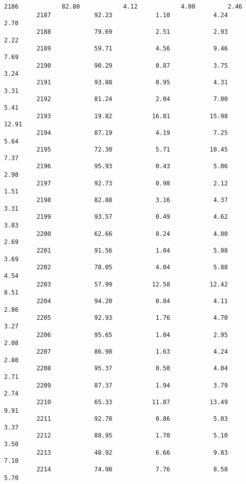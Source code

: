 \documentclass[11pt]{llncs}
\begin{document}
\begin{Verbatim}[commandchars=\\\{\}]
         2186            82.80            4.12            4.00         2.46   
         2187            92.23            1.10            4.24         2.70   
         2188            79.69            2.51            2.93         2.22   
         2189            59.71            4.56            9.46         7.69   
         2190            90.29            0.87            3.75         3.24   
         2191            93.88            0.95            4.31         3.31   
         2192            81.24            2.04            7.00         5.41   
         2193            19.82           16.81           15.98        12.91   
         2194            87.19            4.19            7.25         5.64   
         2195            72.30            5.71           10.45         7.37   
         2196            95.93            0.43            5.06         2.98   
         2197            92.73            0.98            2.12         1.51   
         2198            82.88            3.16            4.37         3.31   
         2199            93.57            0.49            4.62         3.83   
         2200            62.66            8.24            4.00         2.69   
         2201            91.56            1.04            5.08         3.69   
         2202            78.05            4.04            5.88         4.54   
         2203            57.99           12.58           12.42         8.51   
         2204            94.20            0.84            4.11         2.86   
         2205            92.93            1.76            4.70         3.27   
         2206            95.65            1.04            2.95         2.08   
         2207            86.98            1.63            4.24         2.80   
         2208            95.37            0.50            4.04         2.71   
         2209            87.37            1.94            3.79         2.74   
         2210            65.33           11.87           13.49         9.91   
         2211            92.78            0.86            5.03         3.37   
         2212            88.95            1.70            5.10         3.50   
         2213            48.92            6.66            9.83         7.10   
         2214            74.98            7.76            8.58         5.70   
         

\end{Verbatim}
\end{document}
